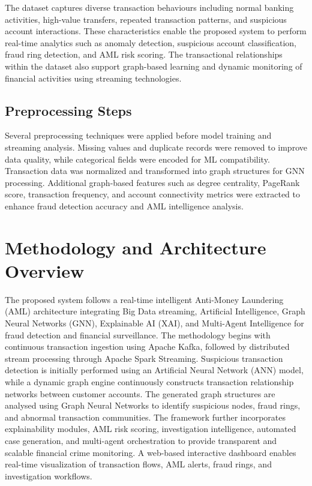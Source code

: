 \documentclass[conference]{IEEEtran}
\begin{document}
The dataset captures diverse transaction behaviours including normal banking activities, high-value transfers, repeated transaction patterns, and suspicious account interactions. These characteristics enable the proposed system to perform real-time analytics such as anomaly detection, suspicious account classification, fraud ring detection, and AML risk scoring. The transactional relationships within the dataset also support graph-based learning and dynamic monitoring of financial activities using streaming technologies.

\subsection{Preprocessing Steps}

Several preprocessing techniques were applied before model training and streaming analysis. Missing values and duplicate records were removed to improve data quality, while categorical fields were encoded for ML compatibility. Transaction data was normalized and transformed into graph structures for GNN processing. Additional graph-based features such as degree centrality, PageRank score, transaction frequency, and account connectivity metrics were extracted to enhance fraud detection accuracy and AML intelligence analysis.

\section{Methodology and Architecture Overview}

The proposed system follows a real-time intelligent Anti-Money Laundering (AML) architecture integrating Big Data streaming, Artificial Intelligence, Graph Neural Networks (GNN), Explainable AI (XAI), and Multi-Agent Intelligence for fraud detection and financial surveillance. The methodology begins with continuous transaction ingestion using Apache Kafka, followed by distributed stream processing through Apache Spark Streaming. Suspicious transaction detection is initially performed using an Artificial Neural Network (ANN) model, while a dynamic graph engine continuously constructs transaction relationship networks between customer accounts. The generated graph structures are analysed using Graph Neural Networks to identify suspicious nodes, fraud rings, and abnormal transaction communities. The framework further incorporates explainability modules, AML risk scoring, investigation intelligence, automated case generation, and multi-agent orchestration to provide transparent and scalable financial crime monitoring. A web-based interactive dashboard enables real-time visualization of transaction flows, AML alerts, fraud rings, and investigation workflows.
\end{document}
